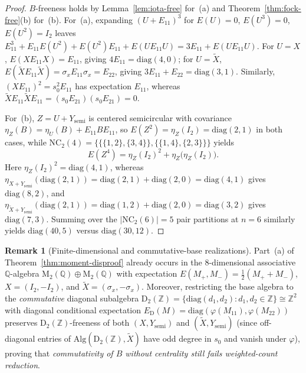 \documentclass[11pt,a4paper]{article}
\theoremstyle{definition}
\newtheorem{remark}[theorem]{Remark}
\newcommand{\NC}{\mathrm{NC}}
\newcommand{\Mat}{\mathrm{M}}
\newcommand{\Diag}{\mathrm{D}}
\newcommand{\Alg}{\mathrm{Alg}}
\begin{document}
\begin{proof}
$B$-freeness holds by Lemma~\ref{lem:iota-free} for~(a) and Theorem~\ref{thm:fock-free}(b) for~(b). For~(a), expanding $(U + E_{11})^3$ for $E(U) = 0$, $E(U^3) = 0$, $E(U^2) = I_2$ leaves $E_{11}^3 + E_{11} E(U^2) + E(U^2) E_{11} + E(U E_{11} U) = 3 E_{11} + E(U E_{11} U)$. For $U = X$, $E(X E_{11} X) = E_{11}$, giving $4 E_{11} = \mathrm{diag}(4,0)$; for $U = \tilde{X}$, $E(\tilde{X} E_{11} \tilde{X}) = \sigma_x E_{11} \sigma_x = E_{22}$, giving $3 E_{11} + E_{22} = \mathrm{diag}(3,1)$. Similarly, $(X E_{11})^2 = s_0^2 E_{11}$ has expectation $E_{11}$, whereas $\tilde{X} E_{11} \tilde{X} E_{11} = (s_0 E_{21})(s_0 E_{21}) = 0$.

For~(b), $Z = U + Y_{\mathrm{semi}}$ is centered semicircular with covariance $\eta_Z(B) = \eta_U(B) + E_{11} B E_{11}$, so $E(Z^2) = \eta_Z(I_2) = \mathrm{diag}(2, 1)$ in both cases, while $\NC_2(4) = \{\{\{1,2\},\{3,4\}\}, \{\{1,4\},\{2,3\}\}\}$ yields
\[
E(Z^4) = \eta_Z(I_2)^2 + \eta_Z\bigl(\eta_Z(I_2)\bigr).
\]
Here $\eta_Z(I_2)^2 = \mathrm{diag}(4, 1)$, whereas $\eta_{X + Y_{\mathrm{semi}}}(\mathrm{diag}(2, 1)) = \mathrm{diag}(2,1) + \mathrm{diag}(2,0) = \mathrm{diag}(4, 1)$ gives $\mathrm{diag}(8, 2)$, and $\eta_{\tilde{X} + Y_{\mathrm{semi}}}(\mathrm{diag}(2, 1)) = \mathrm{diag}(1,2) + \mathrm{diag}(2,0) = \mathrm{diag}(3, 2)$ gives $\mathrm{diag}(7, 3)$. Summing over the $|\NC_2(6)| = 5$ pair partitions at $n = 6$ similarly yields $\mathrm{diag}(40, 5)$ versus $\mathrm{diag}(30, 12)$.
\end{proof}

\begin{remark}[Finite-dimensional and commutative-base realizations]
Part~(a) of Theorem~\ref{thm:moment-disproof} already occurs in the $8$-dimensional associative $\mathbb{Q}$-algebra $\Mat_2(\mathbb{Q}) \oplus \Mat_2(\mathbb{Q})$ with expectation $E(M_+, M_-) = \frac{1}{2}(M_+ + M_-)$, $X = (I_2, -I_2)$, and $\tilde{X} = (\sigma_x, -\sigma_x)$. Moreover, restricting the base algebra to the \emph{commutative} diagonal subalgebra $\Diag_2(\mathbb{Z}) = \{\mathrm{diag}(d_1, d_2) : d_1, d_2 \in \mathbb{Z}\} \cong \mathbb{Z}^2$ with diagonal conditional expectation $E_{\Diag}(M) = \mathrm{diag}(\varphi(M_{11}), \varphi(M_{22}))$ preserves $\Diag_2(\mathbb{Z})$-freeness of both $(X, Y_{\mathrm{semi}})$ and $(\tilde{X}, Y_{\mathrm{semi}})$ (since off-diagonal entries of $\Alg(\Diag_2(\mathbb{Z}), \tilde{X})$ have odd degree in $s_0$ and vanish under $\varphi$), proving that \emph{commutativity of $B$ without centrality still fails weighted-count reduction}.
\end{remark}
\end{document}
